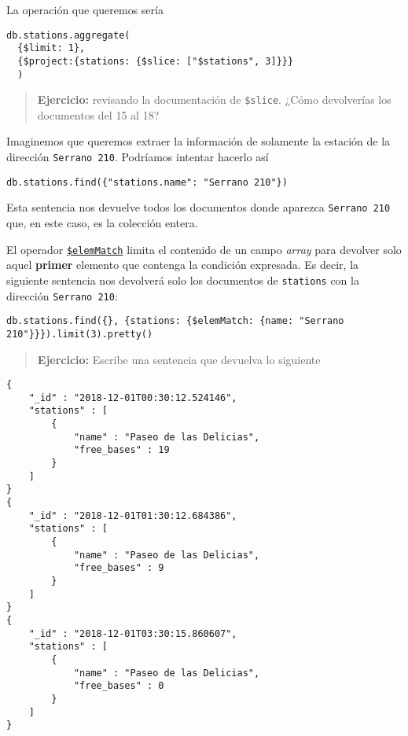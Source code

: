 \documentclass[]{article}
\begin{document}
La operación que queremos sería

\begin{verbatim}
db.stations.aggregate(
  {$limit: 1},
  {$project:{stations: {$slice: ["$stations", 3]}}}
  )
\end{verbatim}

\begin{quote}
\textbf{Ejercicio:} revisando la documentación de \texttt{\$slice}.
¿Cómo devolverías los documentos del 15 al 18?
\end{quote}

Imaginemos que queremos extraer la información de solamente la estación
de la dirección \texttt{Serrano\ 210}. Podríamos intentar hacerlo así

\begin{verbatim}
db.stations.find({"stations.name": "Serrano 210"})
\end{verbatim}

Esta sentencia nos devuelve todos los documentos donde aparezca
\texttt{Serrano\ 210} que, en este caso, es la colección entera.

El operador
\href{https://docs.mongodb.com/manual/reference/operator/projection/elemMatch/\#proj._S_elemMatch}{\texttt{\$elemMatch}}
limita el contenido de un campo \emph{array} para devolver solo aquel
\textbf{primer} elemento que contenga la condición expresada. Es decir,
la siguiente sentencia nos devolverá solo los documentos de
\texttt{stations} con la dirección \texttt{Serrano\ 210}:

\begin{verbatim}
db.stations.find({}, {stations: {$elemMatch: {name: "Serrano 210"}}}).limit(3).pretty()
\end{verbatim}

\begin{quote}
\textbf{Ejercicio:} Escribe una sentencia que devuelva lo siguiente
\end{quote}

\begin{verbatim}
{
    "_id" : "2018-12-01T00:30:12.524146",
    "stations" : [
        {
            "name" : "Paseo de las Delicias",
            "free_bases" : 19
        }
    ]
}
{
    "_id" : "2018-12-01T01:30:12.684386",
    "stations" : [
        {
            "name" : "Paseo de las Delicias",
            "free_bases" : 9
        }
    ]
}
{
    "_id" : "2018-12-01T03:30:15.860607",
    "stations" : [
        {
            "name" : "Paseo de las Delicias",
            "free_bases" : 0
        }
    ]
}
\end{verbatim}
\end{document}
